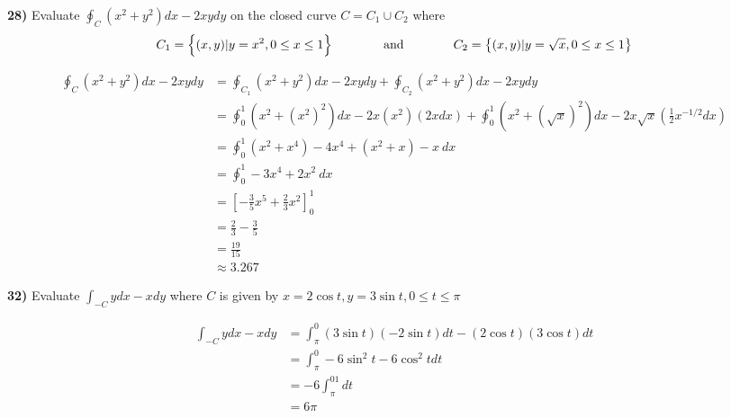 \documentclass{scrartcl}
\begin{document}
\textbf{28)} Evaluate $\oint_C(x^2+y^2)dx - 2xydy$ on the closed curve $C = C_1 \cup C_2$ where $$C_1 = \left\{(x,y) | y=x^2, 0 \le x \le 1\right\} \text{\hspace{0.5in} and \hspace{0.5in}} C_2 = \left\{(x,y) | y=\sqrt{x}, 0 \le x \le 1\right\}$$

\begin{align*}
  \oint_C \left(x^2+y^2\right)dx - 2xydy &= \oint_{C_1} \left(x^2+y^2\right)dx - 2xydy + \oint_{C_2} \left(x^2+y^2\right)dx - 2xydy\\
  &= \oint_0^1 \left(x^2+\left(x^2\right)^2\right)dx - 2x(x^2)(2xdx) + \oint_0^1 (x^2+(\sqrt{x})^2)dx - 2x\sqrt{x}\left(\frac{1}{2}x^{-1/2}dx\right)\\
  &= \oint_0^1 \left(x^2+x^4\right) - 4x^4 + \left(x^2+x\right) - x\ dx\\
  &= \oint_0^1 -3x^4 + 2x^2\ dx \\
  &= \left[-\frac{3}{5}x^5 + \frac{2}{3}x^2\right]_0^1\\
  &= \frac{2}{3} - \frac{3}{5}\\
  &= \frac{19}{15}\\
  &\approx 3.267
\end{align*}\pagebreak

\textbf{32)} Evaluate $\int_{-C}ydx - xdy$ where $C$ is given by $x = 2\cos t, y=3\sin t, 0\le t\le \pi$

\begin{align*}
  \int_{-C}ydx - xdy &= \int_\pi^0\left(3\sin t\right)(-2\sin t)dt - \left(2\cos t\right)(3\cos t)dt\\
  &= \int_\pi^0-6\sin^2t - 6\cos^2tdt\\
  &= -6\int_\pi^01dt\\
  &= 6\pi
\end{align*}
\end{document}
